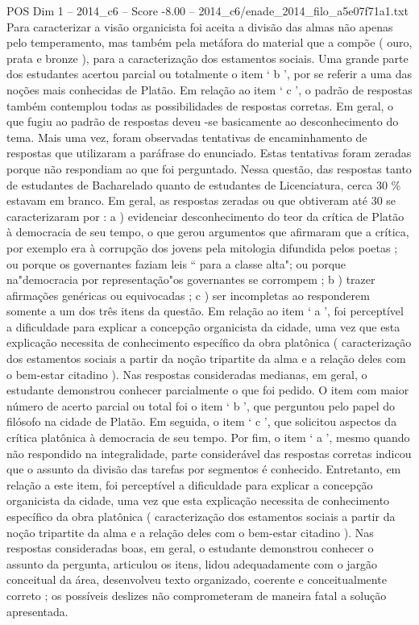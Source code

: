 \begin{textsample}{POS Dim 1 – 2014\_c6 – Score -8.00 – 2014\_c6/enade\_2014\_filo\_a5e07f71a1.txt}
Para caracterizar a visão organicista foi aceita a divisão das almas não apenas pelo temperamento, mas também pela metáfora do material que a compõe ( ouro, prata e bronze ), para a caracterização dos estamentos sociais.
Uma grande parte dos estudantes acertou parcial ou totalmente o item ‘ b ’, por se referir a uma das noções mais conhecidas de Platão.
Em relação ao item ‘ c ’, o padrão de respostas também contemplou todas as possibilidades de respostas corretas.
Em geral, o que fugiu ao padrão de respostas deveu -se basicamente ao desconhecimento do tema.
Mais uma vez, foram observadas tentativas de encaminhamento de respostas que utilizaram a paráfrase do enunciado.
Estas tentativas foram zeradas porque não respondiam ao que foi perguntado.
Nessa questão, das respostas tanto de estudantes de Bacharelado quanto de estudantes de Licenciatura, cerca 30 \% estavam em branco.
Em geral, as respostas zeradas ou que obtiveram até 30 se caracterizaram por : a ) evidenciar desconhecimento do teor da crítica de Platão à democracia de seu tempo, o que gerou argumentos que afirmaram que a crítica, por exemplo era à corrupção dos jovens pela mitologia difundida pelos poetas ; ou porque os governantes faziam leis “ para a classe alta"; ou porque na"democracia por representação"os governantes se corrompem ; b ) trazer afirmações genéricas ou equivocadas ; c ) ser incompletas ao responderem somente a um dos três itens da questão.
Em relação ao item ‘ a ’, foi perceptível a dificuldade para explicar a concepção organicista da cidade, uma vez que esta explicação necessita de conhecimento específico da obra platônica ( caracterização dos estamentos sociais a partir da noção tripartite da alma e a relação deles com o bem-estar citadino ).
Nas respostas consideradas medianas, em geral, o estudante demonstrou conhecer parcialmente o que foi pedido.
O item com maior número de acerto parcial ou total foi o item ‘ b ’, que perguntou pelo papel do filósofo na cidade de Platão.
Em seguida, o item ‘ c ’, que solicitou aspectos da crítica platônica à democracia de seu tempo.
Por fim, o item ‘ a ’, mesmo quando não respondido na integralidade, parte considerável das respostas corretas indicou que o assunto da divisão das tarefas por segmentos é conhecido.
Entretanto, em relação a este item, foi perceptível a dificuldade para explicar a concepção organicista da cidade, uma vez que esta explicação necessita de conhecimento específico da obra platônica ( caracterização dos estamentos sociais a partir da noção tripartite da alma e a relação deles com o bem-estar citadino ).
Nas respostas consideradas boas, em geral, o estudante demonstrou conhecer o assunto da pergunta, articulou os itens, lidou adequadamente com o jargão conceitual da área, desenvolveu texto organizado, coerente e conceitualmente correto ; os possíveis deslizes não comprometeram de maneira fatal a solução apresentada.

\end{textsample}
